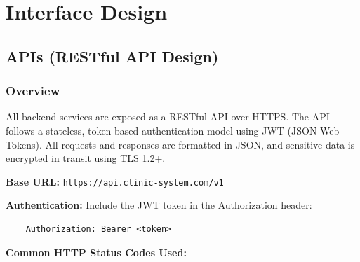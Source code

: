 \section{Interface Design}

\subsection{APIs (RESTful API Design)}

\subsubsection{Overview}

All backend services are exposed as a RESTful API over HTTPS. The API follows a stateless, token-based authentication model using JWT (JSON Web Tokens). All requests and responses are formatted in JSON, and sensitive data is encrypted in transit using TLS 1.2+.

\textbf{Base URL:} \texttt{https://api.clinic-system.com/v1}

\medskip
\textbf{Authentication:}
Include the JWT token in the Authorization header:
\begin{verbatim}
	Authorization: Bearer <token>
\end{verbatim}

\medskip
\textbf{Common HTTP Status Codes Used:}

